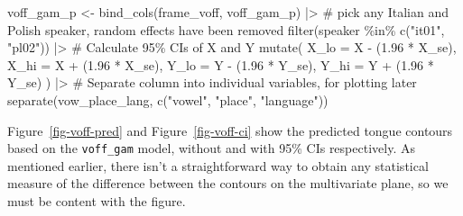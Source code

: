 \documentclass[
  man,
  longtable,
  nolmodern,
  notxfonts,
  notimes,
  colorlinks=true,linkcolor=blue,citecolor=blue,urlcolor=blue]{apa7}
\newenvironment{Shaded}{\begin{snugshade}}{\end{snugshade}}
\newcommand{\AttributeTok}[1]{\textcolor[rgb]{0.40,0.45,0.13}{#1}}
\newcommand{\CommentTok}[1]{\textcolor[rgb]{0.37,0.37,0.37}{#1}}
\newcommand{\FloatTok}[1]{\textcolor[rgb]{0.68,0.00,0.00}{#1}}
\newcommand{\FunctionTok}[1]{\textcolor[rgb]{0.28,0.35,0.67}{#1}}
\newcommand{\NormalTok}[1]{\textcolor[rgb]{0.00,0.23,0.31}{#1}}
\newcommand{\OtherTok}[1]{\textcolor[rgb]{0.00,0.23,0.31}{#1}}
\newcommand{\SpecialCharTok}[1]{\textcolor[rgb]{0.37,0.37,0.37}{#1}}
\newcommand{\StringTok}[1]{\textcolor[rgb]{0.13,0.47,0.30}{#1}}
\begin{document}
\begin{Shaded}
\begin{Highlighting}[]
\NormalTok{voff\_gam\_p }\OtherTok{\textless{}{-}} \FunctionTok{bind\_cols}\NormalTok{(frame\_voff, voff\_gam\_p) }\SpecialCharTok{|\textgreater{}} 
  \CommentTok{\# pick any Italian and Polish speaker, random effects have been removed}
  \FunctionTok{filter}\NormalTok{(speaker }\SpecialCharTok{\%in\%} \FunctionTok{c}\NormalTok{(}\StringTok{"it01"}\NormalTok{, }\StringTok{"pl02"}\NormalTok{)) }\SpecialCharTok{|\textgreater{}} 
  \CommentTok{\# Calculate 95\% CIs of X and Y}
  \FunctionTok{mutate}\NormalTok{(}
    \AttributeTok{X\_lo =}\NormalTok{ X }\SpecialCharTok{{-}}\NormalTok{ (}\FloatTok{1.96} \SpecialCharTok{*}\NormalTok{ X\_se),}
    \AttributeTok{X\_hi =}\NormalTok{ X }\SpecialCharTok{+}\NormalTok{ (}\FloatTok{1.96} \SpecialCharTok{*}\NormalTok{ X\_se),}
    \AttributeTok{Y\_lo =}\NormalTok{ Y }\SpecialCharTok{{-}}\NormalTok{ (}\FloatTok{1.96} \SpecialCharTok{*}\NormalTok{ Y\_se),}
    \AttributeTok{Y\_hi =}\NormalTok{ Y }\SpecialCharTok{+}\NormalTok{ (}\FloatTok{1.96} \SpecialCharTok{*}\NormalTok{ Y\_se)}
\NormalTok{  ) }\SpecialCharTok{|\textgreater{}} 
  \CommentTok{\# Separate column into individual variables, for plotting later}
  \FunctionTok{separate}\NormalTok{(vow\_place\_lang, }\FunctionTok{c}\NormalTok{(}\StringTok{"vowel"}\NormalTok{, }\StringTok{"place"}\NormalTok{, }\StringTok{"language"}\NormalTok{))}
\end{Highlighting}
\end{Shaded}

Figure~\ref{fig-voff-pred} and Figure~\ref{fig-voff-ci} show the
predicted tongue contours based on the \texttt{voff\_gam} model, without
and with 95\% CIs respectively. As mentioned earlier, there isn't a
straightforward way to obtain any statistical measure of the difference
between the contours on the multivariate plane, so we must be content
with the figure.
\end{document}
